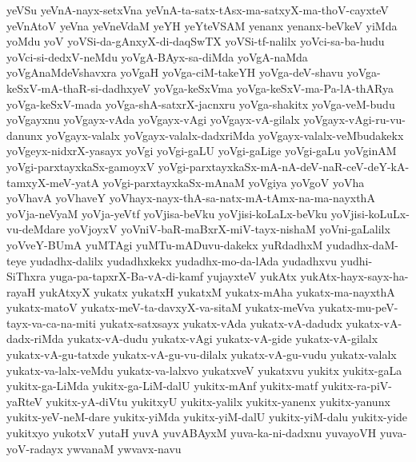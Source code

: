 {yeVSu
yeVnA-nayx-setxVna
yeVnA-ta-satx-tAsx-ma-satxyX-ma-thoV-cayxteV
yeVnAtoV
yeVna
yeVneVdaM
yeYH
yeYteVSAM
yenanx
yenanx-beVkeV
yiMda
yoMdu
yoV
yoVSi-da-gAnxyX-di-daqSwTX
yoVSi-tf-nalilx
yoVci-sa-ba-hudu
yoVci-si-dedxV-neMdu
yoVgA-BAyx-sa-diMda
yoVgA-naMda
yoVgAnaMdeVshavxra
yoVgaH
yoVga-ciM-takeYH
yoVga-deV-shavu
yoVga-keSxV-mA-thaR-si-dadhxyeV
yoVga-keSxVma
yoVga-keSxV-ma-Pa-lA-thARya
yoVga-keSxV-mada
yoVga-shA-satxrX-jacnxru
yoVga-shakitx
yoVga-veM-budu
yoVgayxnu
yoVgayx-vAda
yoVgayx-vAgi
yoVgayx-vA-gilalx
yoVgayx-vAgi-ru-vu-danunx
yoVgayx-valalx
yoVgayx-valalx-dadxriMda
yoVgayx-valalx-veMbudakekx
yoVgeyx-nidxrX-yasayx
yoVgi
yoVgi-gaLU
yoVgi-gaLige
yoVgi-gaLu
yoVginAM
yoVgi-parxtayxkaSx-gamoyxV
yoVgi-parxtayxkaSx-mA-nA-deV-naR-ceV-deY-kA-tamxyX-meV-yatA
yoVgi-parxtayxkaSx-mAnaM
yoVgiya
yoVgoV
yoVha
yoVhavA
yoVhaveY
yoVhayx-nayx-thA-sa-natx-mA-tAmx-na-ma-nayxthA
yoVja-neVyaM
yoVja-yeVtf
yoVjisa-beVku
yoVjisi-koLaLx-beVku
yoVjisi-koLuLx-vu-deMdare
yoVjoyxV
yoVniV-baR-maBxrX-miV-tayx-nishaM
yoVni-gaLalilx
yoVveY-BUmA
yuMTAgi
yuMTu-mADuvu-dakekx
yuRdadhxM
yudadhx-daM-teye
yudadhx-dalilx
yudadhxkekx
yudadhx-mo-da-lAda
yudadhxvu
yudhi-SiThxra
yuga-pa-tapxrX-Ba-vA-di-kamf
yujayxteV
yukAtx
yukAtx-hayx-sayx-ha-rayaH
yukAtxyX
yukatx
yukatxH
yukatxM
yukatx-mAha
yukatx-ma-nayxthA
yukatx-matoV
yukatx-meV-ta-davxyX-va-sitaM
yukatx-meVva
yukatx-mu-peV-tayx-va-ca-na-miti
yukatx-satxsayx
yukatx-vAda
yukatx-vA-dadudx
yukatx-vA-dadx-riMda
yukatx-vA-dudu
yukatx-vAgi
yukatx-vA-gide
yukatx-vA-gilalx
yukatx-vA-gu-tatxde
yukatx-vA-gu-vu-dilalx
yukatx-vA-gu-vudu
yukatx-valalx
yukatx-va-lalx-veMdu
yukatx-va-lalxvo
yukatxveV
yukatxvu
yukitx
yukitx-gaLa
yukitx-ga-LiMda
yukitx-ga-LiM-dalU
yukitx-mAnf
yukitx-matf
yukitx-ra-piV-yaRteV
yukitx-yA-diVtu
yukitxyU
yukitx-yalilx
yukitx-yanenx
yukitx-yanunx
yukitx-yeV-neM-dare
yukitx-yiMda
yukitx-yiM-dalU
yukitx-yiM-dalu
yukitx-yide
yukitxyo
yukotxV
yutaH
yuvA
yuvABAyxM
yuva-ka-ni-dadxnu
yuvayoVH
yuva-yoV-radayx
ywvanaM
ywvavx-navu
}
